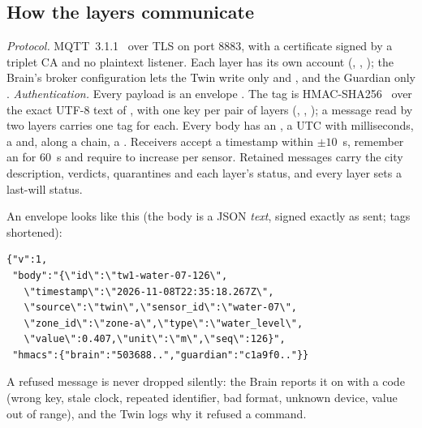 \subsection{How the layers communicate}
\emph{Protocol.} MQTT~3.1.1~\cite{mqtt} over TLS on port 8883, with a certificate signed by a triplet CA and no plaintext
listener. Each layer has its own account (, , ); the Brain's broker configuration lets the Twin
write only  and , and the Guardian only .
\emph{Authentication.} Every payload is an envelope . The tag is
HMAC-SHA256~\cite{hmac} over the exact UTF-8 text of , with one key per pair of layers (,
, ); a message read by two layers carries one tag for each. Every body has an , a UTC
 with milliseconds, a  and, along a chain, a . Receivers accept a timestamp within
$\pm10$~s, remember an  for 60~s and require  to increase per sensor. Retained messages carry the city description,
verdicts, quarantines and each layer's status, and every layer sets a last-will  status.

An envelope looks like this (the body is a JSON \emph{text}, signed exactly as sent; tags shortened):

{\footnotesize\begin{verbatim}
{"v":1,
 "body":"{\"id\":\"tw1-water-07-126\",
   \"timestamp\":\"2026-11-08T22:35:18.267Z\",
   \"source\":\"twin\",\"sensor_id\":\"water-07\",
   \"zone_id\":\"zone-a\",\"type\":\"water_level\",
   \"value\":0.407,\"unit\":\"m\",\"seq\":126}",
 "hmacs":{"brain":"503688..","guardian":"c1a9f0.."}}
\end{verbatim}}

A refused message is never dropped silently: the Brain reports it on  with a code (wrong key, stale clock,
repeated identifier, bad format, unknown device, value out of range), and the Twin logs why it refused a command.

